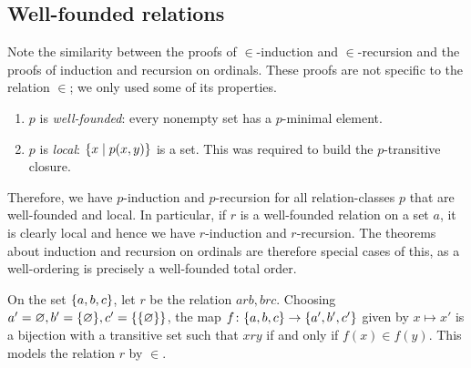 \subsection{Well-founded relations}
Note the similarity between the proofs of \( \in \)-induction and \( \in \)-recursion and the proofs of induction and recursion on ordinals.
These proofs are not specific to the relation \( \in \); we only used some of its properties.
\begin{enumerate}
    \item \( p \) is \emph{well-founded}: every nonempty set has a \( p \)-minimal element.
    \item \( p \) is \emph{local}: \( \qty{x \mid p(x,y)} \) is a set.
    This was required to build the \( p \)-transitive closure.
\end{enumerate}
Therefore, we have \( p \)-induction and \( p \)-recursion for all relation-classes \( p \) that are well-founded and local.
In particular, if \( r \) is a well-founded relation on a set \( a \), it is clearly local and hence we have \( r \)-induction and \( r \)-recursion.
The theorems about induction and recursion on ordinals are therefore special cases of this, as a well-ordering is precisely a well-founded total order.

On the set \( \qty{a, b, c} \), let \( r \) be the relation \( arb, brc \).
Choosing \( a' = \varnothing, b' = \qty{\varnothing}, c' = \qty{\qty{\varnothing}} \), the map \( f \colon \qty{a, b, c} \to \qty{a', b', c'} \) given by \( x \mapsto x' \) is a bijection with a transitive set such that \( xry \) if and only if \( f(x) \in f(y) \).
This models the relation \( r \) by \( \in \).

